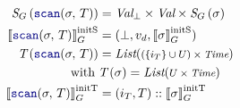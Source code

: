\begin{align}
    \stateTy{\scan{\sigma}{T}}   & = \ValBot \times \Val \times \stateTy{\sigma} \label{eq:semantics:grfrp:opsem:stateTy:op:scan} \\
    \initstate{\scan{\sigma}{T}} & = (\bot, v_d, \initstate{\sigma}) \label{eq:semantics:grfrp:opsem:init:op:scan:state}          \\
    \timerTy{\scan{\sigma}{T}}   & = \List{(\{i_T\} \cup U) \times \Time} \label{eq:semantics:grfrp:opsem:timerTy:op:scan}        \\
    \text{with} \;               & \timerTy{\sigma} = \List{U \times \Time} \nonumber                                             \\
    \inittimer{\scan{\sigma}{T}} & = (i_T, T) :: \inittimer{\sigma} \label{eq:semantics:grfrp:opsem:init:op:scan:timer}
\end{align}

